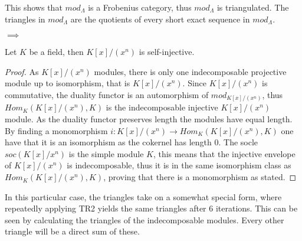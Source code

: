     This shows that $mod_{\Lambda}$ is a Frobenius category, thus \underline{$mod_{\Lambda}$} is triangulated. The triangles in \underline{$mod_{\Lambda}$} are the quotients of every short exact sequence in $mod_{\Lambda}$.
    \begin{center}
        $\implies$
    \end{center}



    \begin{prop}
        Let $K$ be a field, then $K[x]/(x^n)$ is self-injective.
    \end{prop}

    \begin{proof}
        As $K[x]/(x^n)$ modules, there is only one indecomposable projective module up to isomorphism, that is $K[x]/(x^n)$. Since $K[x]/(x^n)$ is commutative, the duality functor is an automorphism of $mod_{K[x]/(x^n)}$, thus $Hom_K(K[x]/(x^n),K)$ is the indecomposable injective $K[x]/(x^n)$ module. As the duality functor preserves length the modules have equal length. By finding a monomorphism $i:K[x]/(x^n)\rightarrow Hom_K(K[x]/(x^n),K)$ one have that it is an isomorphism as the cokernel has length $0$. The socle $soc(K[x]/x^n)$ is the simple module $K$, this means that the injective envelope of $K[x]/(x^n)$ is indecomposable, thus it is in the same isomorphism class as $Hom_K(K[x]/(x^n),K)$, proving that there is a monomorphism as stated.
    \end{proof}

    In this particular case, the triangles take on a somewhat special form, where repeatedly applying TR2 yields the same triangles after 6 iterations. This can be seen by calculating the triangles of the indecomposable modules. Every other triangle will be a direct sum of these. \\

